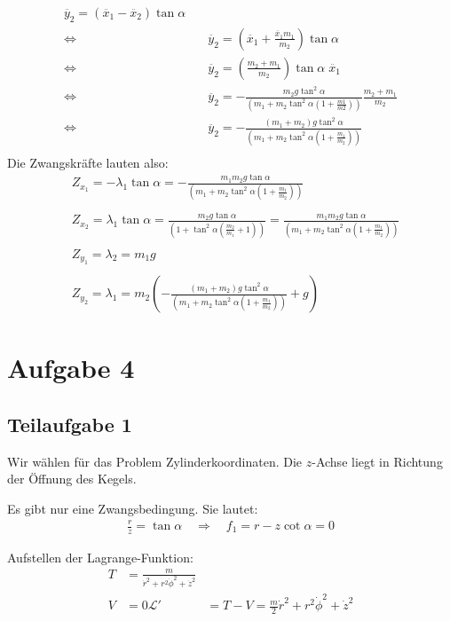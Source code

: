 \documentclass[a4paper,german,12pt,smallheadings]{scrartcl}
\begin{document}
\begin{align*}
\ddot{y_2}=\left(\ddot{x_1}-\ddot{x_2}\right) \tan \alpha\\
\Leftrightarrow & \quad \ddot{y_2}=\left(\ddot{x_1}+\frac{\ddot{x_1}m_1}{m_2}\right) \tan \alpha\\
\Leftrightarrow & \quad \ddot{y_2}=\left(\frac{m_2+m_1}{m_2}\right) \tan \alpha \; \ddot{x_1}\\
\Leftrightarrow & \quad \ddot{y_2}=-\frac{m_2g\tan^2 \alpha}{\left(m_1+m_2\tan^2 \alpha \left(1+\frac{m1}{m2}\right)\right)} \frac{m_2+m_1}{m_2}\\
\Leftrightarrow & \quad \ddot{y_2}=-\frac{\left(m_1+m_2\right)g\tan^2 \alpha}{\left(m_1+m_2\tan^2 \alpha \left(1+\frac{m_1}{m_2}\right)\right)}\\
\end{align*}
Die Zwangskräfte lauten also:
\begin{align*}
& Z_{x_1}=-\lambda_1 \tan \alpha=-\frac{m_1 m_2 g \tan \alpha}{\left(m_1+m_2 \tan^2 \alpha \left(1+\frac{m_1}{m_2}\right)\right)}\\
\\
& Z_{x_2}=\lambda_1 \tan \alpha=\frac{m_2 g \tan \alpha}{\left(1+\tan^2 \alpha \left(\frac{m_2}{m_1}+1\right) \right)}=\frac{m_1 m_2 g \tan \alpha}{\left(m_1+m_2 \tan^2 \alpha \left(1+\frac{m_1}{m_2}\right)\right)}\\
\\
& Z_{y_1}=\lambda_2=m_1g\\
\\
& Z_{y_2}=\lambda_1=m_2\left(-\frac{\left(m_1+m_2\right)g\tan^2 \alpha}{\left(m_1+m_2\tan^2 \alpha \left(1+\frac{m_1}{m_2}\right)\right)}+g\right)
\end{align*}

\section*{Aufgabe 4}
\subsection*{Teilaufgabe 1}
Wir wählen für das Problem Zylinderkoordinaten. Die $z$-Achse liegt in Richtung
der Öffnung des Kegels.

Es gibt nur eine Zwangsbedingung. Sie lautet:
\begin{align*}
\frac{r}{z}=\tan \alpha \quad \Rightarrow \quad f_1=r-z \cot \alpha =0
\end{align*}

Aufstellen der Lagrange-Funktion:
\begin{align*}
T&=\frac{m}{\dot{r}^2+r^2\dot{\phi}^2+\dot{z}^2} \\
V&=0
\mathcal{L}'&=T-V=\frac{m}{2} \dot{r}^2+r^2\dot{\phi}^2+\dot{z}^2
\end{align*}
\end{document}
